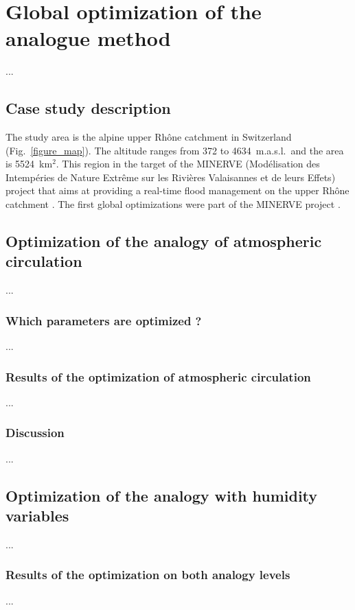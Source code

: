 \documentclass{ametsoc}
\begin{document}
\section{Global optimization of the analogue method}
...

\subsection{Case study description}

The study area is the alpine upper Rhône catchment in Switzerland (Fig.\ \ref{figure_map}). The altitude ranges from 372 to 4634~m.a.s.l.\ and the area is 5524~km$^{2}$. This region in the target of the MINERVE (Mod\'{e}lisation des Intemp\'{e}ries de Nature Extr\^{e}me sur les Rivi\`{e}res Valaisannes et de leurs Effets) project that aims at providing a real-time flood management on the upper Rh\^{o}ne catchment \citep{GarciaHernandez2009b}. The first global optimizations were part of the MINERVE project \citep{Horton2012, Horton2012a}.


\subsection{Optimization of the analogy of atmospheric circulation}
...

\subsubsection{Which parameters are optimized ?}
...

\subsubsection{Results of the optimization of atmospheric circulation}
...

\subsubsection{Discussion}
...


\subsection{Optimization of the analogy with humidity variables}
...

\subsubsection{Results of the optimization on both analogy levels}
...
\end{document}
